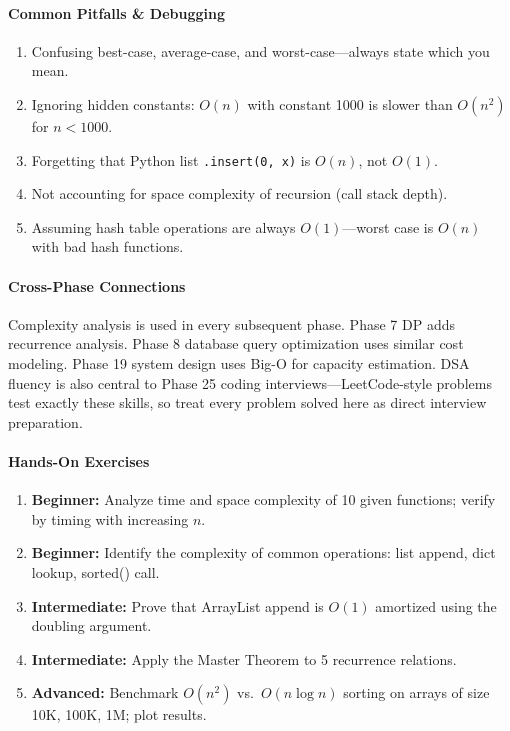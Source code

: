 \documentclass[11pt, a4paper, oneside]{report}
\begin{document}
\paragraph{Common Pitfalls \& Debugging}
\begin{enumerate}[leftmargin=*]
\item Confusing best-case, average-case, and worst-case---always state which you mean.
\item Ignoring hidden constants: $O(n)$ with constant 1000 is slower than $O(n^2)$ for $n < 1000$.
\item Forgetting that Python list \texttt{.insert(0, x)} is $O(n)$, not $O(1)$.
\item Not accounting for space complexity of recursion (call stack depth).
\item Assuming hash table operations are always $O(1)$---worst case is $O(n)$ with bad hash functions.
\end{enumerate}

\paragraph{Cross-Phase Connections} Complexity analysis is used in every subsequent phase. Phase 7 DP adds recurrence analysis. Phase 8 database query optimization uses similar cost modeling. Phase 19 system design uses Big-O for capacity estimation. DSA fluency is also central to Phase 25 coding interviews---LeetCode-style problems test exactly these skills, so treat every problem solved here as direct interview preparation.

\paragraph{Hands-On Exercises}
\begin{enumerate}[leftmargin=*]
\item \textbf{Beginner:} Analyze time and space complexity of 10 given functions; verify by timing with increasing $n$.
\item \textbf{Beginner:} Identify the complexity of common operations: list append, dict lookup, sorted() call.
\item \textbf{Intermediate:} Prove that ArrayList append is $O(1)$ amortized using the doubling argument.
\item \textbf{Intermediate:} Apply the Master Theorem to 5 recurrence relations.
\item \textbf{Advanced:} Benchmark $O(n^2)$ vs.\ $O(n \log n)$ sorting on arrays of size 10K, 100K, 1M; plot results.
\end{enumerate}
\end{document}
